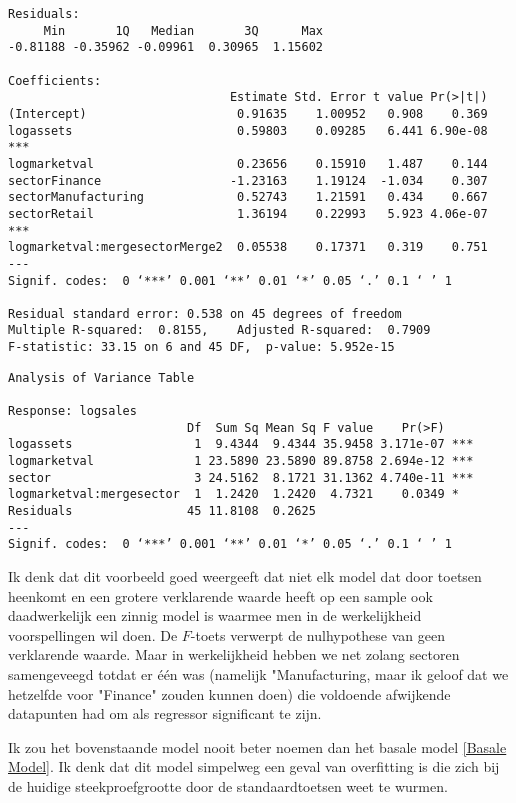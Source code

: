 \documentclass[a4paper]{report}
\begin{document}
\begin{verbatim}
Residuals:
     Min       1Q   Median       3Q      Max 
-0.81188 -0.35962 -0.09961  0.30965  1.15602 

Coefficients:
                               Estimate Std. Error t value Pr(>|t|)    
(Intercept)                     0.91635    1.00952   0.908    0.369    
logassets                       0.59803    0.09285   6.441 6.90e-08 ***
logmarketval                    0.23656    0.15910   1.487    0.144    
sectorFinance                  -1.23163    1.19124  -1.034    0.307    
sectorManufacturing             0.52743    1.21591   0.434    0.667    
sectorRetail                    1.36194    0.22993   5.923 4.06e-07 ***
logmarketval:mergesectorMerge2  0.05538    0.17371   0.319    0.751    
---
Signif. codes:  0 ‘***’ 0.001 ‘**’ 0.01 ‘*’ 0.05 ‘.’ 0.1 ‘ ’ 1

Residual standard error: 0.538 on 45 degrees of freedom
Multiple R-squared:  0.8155,	Adjusted R-squared:  0.7909 
F-statistic: 33.15 on 6 and 45 DF,  p-value: 5.952e-15
\end{verbatim}

\begin{verbatim}
Analysis of Variance Table

Response: logsales
                         Df  Sum Sq Mean Sq F value    Pr(>F)    
logassets                 1  9.4344  9.4344 35.9458 3.171e-07 ***
logmarketval              1 23.5890 23.5890 89.8758 2.694e-12 ***
sector                    3 24.5162  8.1721 31.1362 4.740e-11 ***
logmarketval:mergesector  1  1.2420  1.2420  4.7321    0.0349 *  
Residuals                45 11.8108  0.2625                      
---
Signif. codes:  0 ‘***’ 0.001 ‘**’ 0.01 ‘*’ 0.05 ‘.’ 0.1 ‘ ’ 1
\end{verbatim}

  
  Ik denk dat dit voorbeeld goed weergeeft dat niet elk model dat door toetsen heenkomt en een grotere verklarende waarde heeft op een sample ook daadwerkelijk een zinnig model is waarmee men in de werkelijkheid voorspellingen wil doen. De $F$-toets verwerpt de nulhypothese van geen verklarende waarde. Maar in werkelijkheid hebben we net zolang sectoren samengeveegd totdat er \' e\' en was (namelijk "Manufacturing, maar ik geloof dat we hetzelfde voor "Finance" zouden kunnen doen) die voldoende afwijkende datapunten had om als regressor significant te zijn.
  
  Ik zou het bovenstaande model nooit beter noemen dan het basale model \ref{Basale Model}. Ik denk dat dit model simpelweg een geval van overfitting is die zich bij de huidige steekproefgrootte door de standaardtoetsen weet te wurmen.
  
\end{document}
